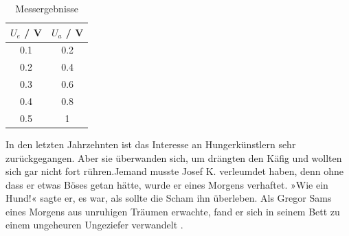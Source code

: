 \begin{table}[h]
	\centering
	\begin{tabular}[h]{|c|c|}
		\hline
		$U_e$ / V& $U_a$ / V\\ \hline
		0.1 & 0.2 \\ \hline
		0.2 & 0.4 \\ \hline
		0.3 & 0.6 \\ \hline
		0.4 & 0.8 \\ \hline
		0.5 & 1 \\ \hline
	\end{tabular}
	\caption{Messergebnisse}
\end{table}

In den letzten Jahrzehnten ist das Interesse an Hungerkünstlern sehr zurückgegangen. Aber sie überwanden sich, um drängten den Käfig und wollten sich gar nicht fort rühren.Jemand musste Josef K. verleumdet haben, denn ohne dass er etwas Böses getan hätte, wurde er eines Morgens verhaftet. »Wie ein Hund!« sagte er, es war, als sollte die Scham ihn überleben. Als Gregor Sams eines Morgens aus unruhigen Träumen erwachte, fand er sich in seinem Bett zu einem ungeheuren Ungeziefer verwandelt \cite{Pleisteiner.2007}.
